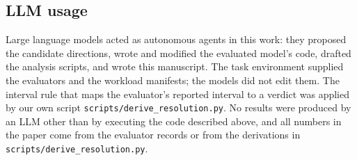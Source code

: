 \documentclass{article}
\begin{document}
\subsection{LLM usage}
\label{sec:si-llm}
Large language models acted as autonomous agents in this work: they proposed the candidate directions, wrote and modified the evaluated model's code, drafted the analysis scripts, and wrote this manuscript. The task environment supplied the evaluators and the workload manifests; the models did not edit them. The interval rule that maps the evaluator's reported interval to a verdict was applied by our own script \texttt{scripts/derive\_resolution.py}. No results were produced by an LLM other than by executing the code described above, and all numbers in the paper come from the evaluator records or from the derivations in \texttt{scripts/derive\_resolution.py}.
\end{document}
